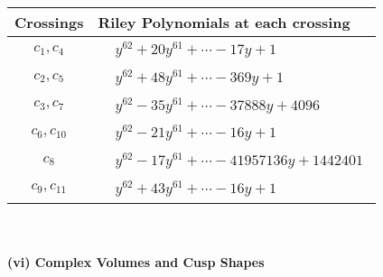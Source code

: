 \documentclass[1p]{elsarticle_modified}
\theoremstyle{definition}
\begin{document}
\begin{tabular}{m{50pt}|m{274pt}}
Crossings & \hspace{64pt}Riley Polynomials at each crossing \\
\hline $$\begin{aligned}c_{1},c_{4}\end{aligned}$$&$\begin{aligned}
&y^{62}+20 y^{61}+\cdots-17 y+1
\end{aligned}$\\
\hline $$\begin{aligned}c_{2},c_{5}\end{aligned}$$&$\begin{aligned}
&y^{62}+48 y^{61}+\cdots-369 y+1
\end{aligned}$\\
\hline $$\begin{aligned}c_{3},c_{7}\end{aligned}$$&$\begin{aligned}
&y^{62}-35 y^{61}+\cdots-37888 y+4096
\end{aligned}$\\
\hline $$\begin{aligned}c_{6},c_{10}\end{aligned}$$&$\begin{aligned}
&y^{62}-21 y^{61}+\cdots-16 y+1
\end{aligned}$\\
\hline $$\begin{aligned}c_{8}\end{aligned}$$&$\begin{aligned}
&y^{62}-17 y^{61}+\cdots-41957136 y+1442401
\end{aligned}$\\
\hline $$\begin{aligned}c_{9},c_{11}\end{aligned}$$&$\begin{aligned}
&y^{62}+43 y^{61}+\cdots-16 y+1
\end{aligned}$\\
\hline
\end{tabular}\\~\\
\newpage\flushleft \textbf{(vi) Complex Volumes and Cusp Shapes}
\end{document}
